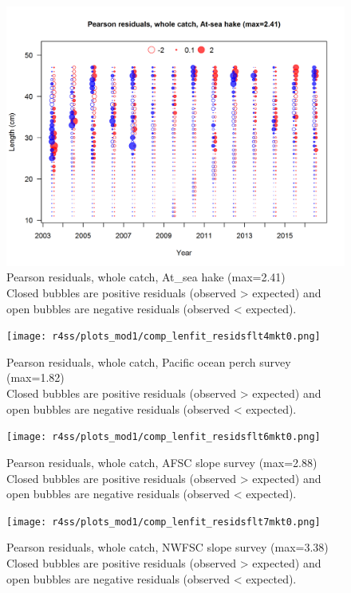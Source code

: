 \documentclass[12pt,]{article}
\begin{document}
\begin{figure}
\centering
\includegraphics{r4ss/plots_mod1/comp_lenfit_residsflt2mkt0.png}
\caption{Pearson residuals, whole catch, At\_sea hake (max=2.41)\\
Closed bubbles are positive residuals (observed \textgreater{} expected)
and open bubbles are negative residuals (observed \textless{} expected).
\label{fig:ashop_len_pearson}}
\end{figure}

\begin{figure}
\centering
\texttt{[image: r4ss/plots\_mod1/comp\_lenfit\_residsflt4mkt0.png]}
\caption{Pearson residuals, whole catch, Pacific ocean perch survey
(max=1.82)\\
Closed bubbles are positive residuals (observed \textgreater{} expected)
and open bubbles are negative residuals (observed \textless{} expected).
\label{fig:pop_len_pearson}}
\end{figure}

\begin{figure}
\centering
\texttt{[image: r4ss/plots\_mod1/comp\_lenfit\_residsflt6mkt0.png]}
\caption{Pearson residuals, whole catch, AFSC slope survey (max=2.88)\\
Closed bubbles are positive residuals (observed \textgreater{} expected)
and open bubbles are negative residuals (observed \textless{} expected).
\label{fig:afsc_len_pearson}}
\end{figure}

\begin{figure}
\centering
\texttt{[image: r4ss/plots\_mod1/comp\_lenfit\_residsflt7mkt0.png]}
\caption{Pearson residuals, whole catch, NWFSC slope survey (max=3.38)\\
Closed bubbles are positive residuals (observed \textgreater{} expected)
and open bubbles are negative residuals (observed \textless{} expected).
\label{fig:nwfsc_len_pearson}}
\end{figure}
\end{document}

